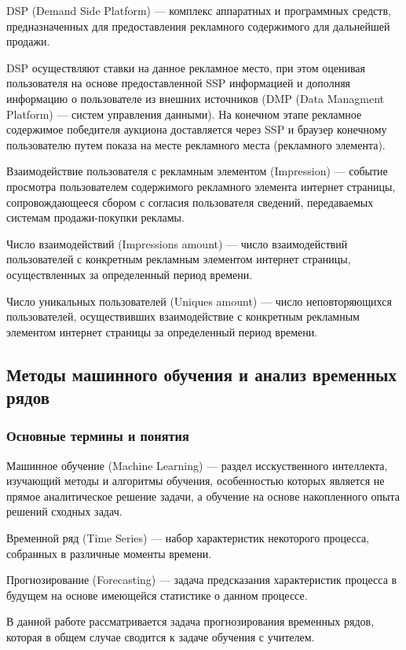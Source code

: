 DSP (Demand Side Platform) --- комплекс аппаратных и программных средств, предназначенных для предоставления
рекламного содержимого для дальнейшей продажи.

DSP осуществляют ставки на данное рекламное место, при этом оценивая пользователя на основе предоставленной
SSP информацией и дополняя информацию о пользователе из внешних источников (DMP (Data Managment Platform) --- 
систем управления данными). На конечном этапе рекламное содержимое победителя аукциона доставляется через SSP и
браузер конечному пользователю путем показа на месте рекламного места (рекламного элемента).

Взаимодействие пользователя с рекламным элементом (Impression) --- событие просмотра пользователем содержимого
рекламного элемента интернет страницы, сопровождающееся сбором с согласия пользователя сведений, передаваемых 
системам продажи-покупки рекламы.

Число взаимодействий (Impressions amount) --- число взаимодействий пользователей с конкретным рекламным элементом
интернет страницы, осуществленных за определенный период времени.

Число уникальных пользователей (Uniques amount) --- число неповторяющихся пользователей, осуществивших взаимодействие
с конкретным рекламным элементом интернет страницы за определенный период времени.

\subsection{Методы машинного обучения и анализ временных рядов}
\subsubsection{Основные термины и понятия}

Машинное обучение (Machine Learning) --- раздел исскуственного интеллекта, изучающий методы и алгоритмы обучения,
особенностью которых является не прямое аналитическое решение задачи, а обучение на основе накопленного опыта решений
сходных задач.

Временной ряд (Time Series) --- набор характеристик некоторого процесса, собранных в различные моменты времени.

Прогнозирование (Forecasting) --- задача предсказания характеристик процесса в будущем на основе имеющейся статистике
о данном процессе.

В данной работе рассматривается задача прогнозирования временных рядов, которая в общем случае сводится к задаче
обучения с учителем.

